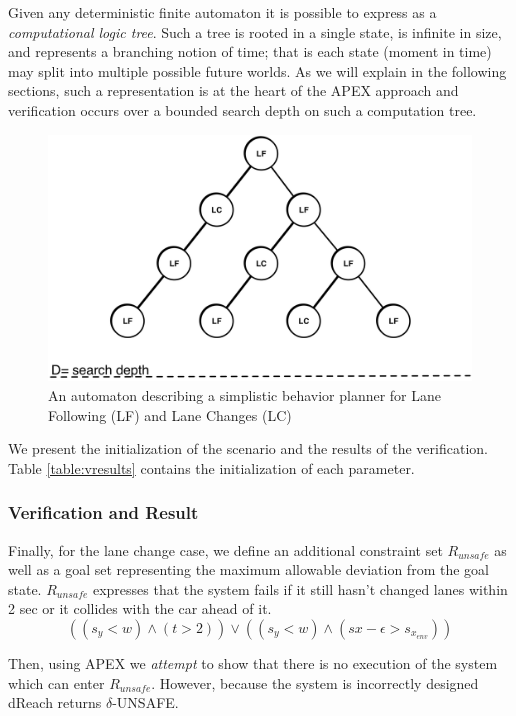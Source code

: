 Given any deterministic finite automaton it is possible to express as a \emph{computational logic tree}. Such a tree is rooted in a single state, is infinite in size, and represents a branching notion of time; that is each state (moment in time) may split into multiple possible future worlds. As we will explain in the following sections, such a representation is at the heart of the APEX approach and verification occurs over a bounded search depth on such a computation tree. 

\begin{figure}[h]
	\centering
	\vspace{-10pt}
	\includegraphics[width=\columnwidth]{figures/exec_tree}
	\caption{An automaton describing a simplistic behavior planner for Lane Following (LF) and Lane Changes (LC)}
	\label{fig:extree}
\end{figure}

We present the initialization of the scenario and the results of the verification. Table \ref{table:vresults} contains the initialization of each parameter.
\subsubsection{Verification and Result}
Finally, for the lane change case, we define an additional constraint set $R_{unsafe}$ as well as a goal set representing the maximum allowable deviation from the goal state. $R_{unsafe}$ expresses that the system fails if it still hasn't changed lanes within 2 sec or it collides with the car ahead of it.
\begin{equation}
\left((s_y<w) \wedge (t>2) \right) \vee \left( (s_y<w) \wedge (sx-\epsilon>s_{x_{env}})\right)
\end{equation}

Then, using APEX we \emph{attempt} to show that there is no execution of the system which can enter $R_{unsafe}$. However, because the system is incorrectly designed dReach returns $\delta$-UNSAFE. 

